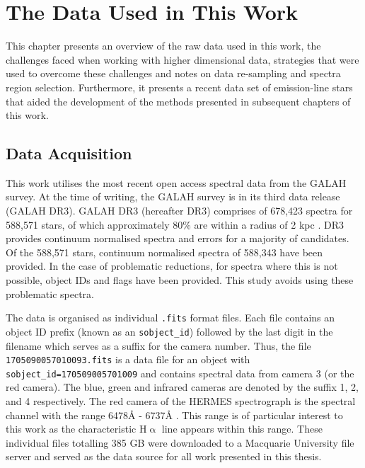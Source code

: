 \chapter{The Data Used in This Work}

This chapter presents an overview of the raw data used in this work, the challenges faced when working with higher dimensional data, strategies that were used to overcome these challenges and notes on data re-sampling and spectra region selection. Furthermore, it presents a recent data set of emission-line stars that aided the development of the methods presented in subsequent chapters of this work.

\section{Data Acquisition}

This work utilises the most recent open access spectral data from the GALAH survey. At the time of writing, the GALAH survey is in its third data release (GALAH DR3). GALAH DR3 (hereafter DR3) comprises of 678,423 spectra for 588,571 stars, of which approximately 80\% are within a radius of 2 kpc \citep{buder2021galah+}. DR3 provides continuum normalised spectra and errors for a majority of candidates. Of the 588,571 stars, continuum normalised spectra of 588,343 have been provided. In the case of problematic reductions, for spectra where this is not possible, object IDs and flags have been provided. This study avoids using these problematic spectra.

The data is organised as individual \texttt{.fits} format files. Each file contains an object ID prefix (known as an \texttt{sobject\_id}) followed by the last digit in the filename which serves as a suffix for the camera number. Thus, the file \texttt{1705090057010093.fits} is a data file for an object with \texttt{sobject\_id=170509005701009} and contains spectral data from camera 3 (or the red camera). The blue, green and infrared cameras are denoted by the suffix 1, 2, and 4 respectively.
The red camera of the HERMES spectrograph is the spectral channel with the range 6478\r{A} - 6737\r{A} \citep{sheinis2014first}. This range is of particular interest to this work as the characteristic H$\upalpha$ line appears within this range. These individual files totalling 385 GB were downloaded to a Macquarie University file server and served as the data source for all work presented in this thesis.

